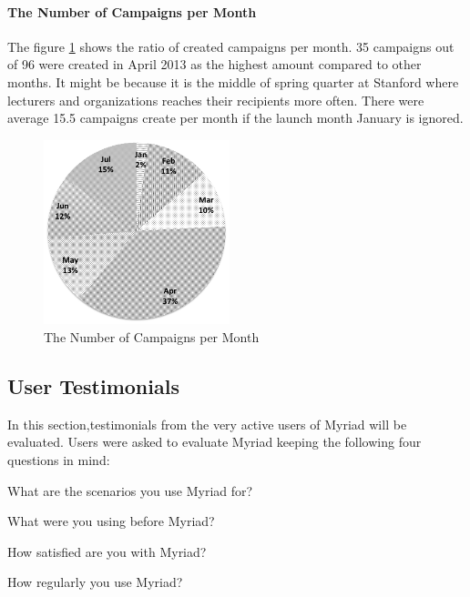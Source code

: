 \paragraph{The Number of Campaigns per Month} The figure \ref{fig:ChartCampaignsMonths} shows the ratio of created campaigns per month. 35 campaigns out of 96 were created in April 2013 as the highest amount compared to other months. It might be because it is the middle of spring quarter at Stanford where lecturers and organizations reaches their recipients more often. There were average 15.5 campaigns create per month if the launch month January is ignored.

\begin{figure}[htbp]
	\centering
	\includegraphics[width=0.48\textwidth]{imgs/ChartCampaignsMonths.png}
	\caption[The Number of Campaigns per Month]{The Number of Campaigns per Month}
	\label{fig:ChartCampaignsMonths}
\end{figure}

\clearpage

\subsection{User Testimonials}
\label{subsec:5.4.2:UserTest}

In this section,testimonials from the very active users of Myriad will be evaluated. Users were asked to evaluate Myriad keeping the following four questions in mind:

\begin{compactenum}
	\item What are the scenarios you use Myriad for?
	\item What were you using before Myriad?
	\item How satisfied are you with Myriad?
	\item How regularly you use Myriad?
\end{compactenum}

